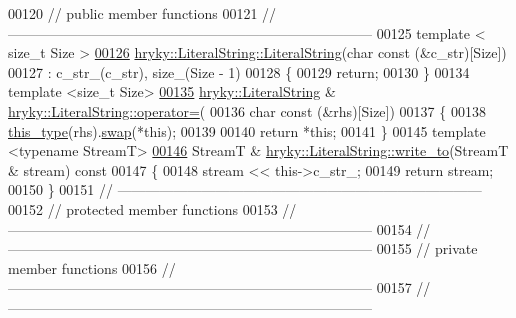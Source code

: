 \begin{DoxyCode}
00120 \textcolor{comment}{// public member functions}
00121 \textcolor{comment}{//
      ------------------------------------------------------------------------------}
00125 \textcolor{comment}{}\textcolor{keyword}{template} < \textcolor{keywordtype}{size\_t} Size >
\hypertarget{literal__string_8h_source_l00126}{}\hyperlink{classhryky_1_1_literal_string_a49f738a4ab21416ad537d0e21a64b8bd}{00126} \hyperlink{classhryky_1_1_literal_string_a2a4124b3bdb4cef9b2d71b318b702038}{hryky::LiteralString::LiteralString}(\textcolor{keywordtype}{char} \textcolor{keyword}{const} (&c\_str)[Size])
00127     : c\_str\_(c\_str), size\_(Size - 1)
00128 \{
00129     \textcolor{keywordflow}{return};
00130 \}
00134 \textcolor{keyword}{template} <\textcolor{keywordtype}{size\_t} Size>
\hypertarget{literal__string_8h_source_l00135}{}\hyperlink{classhryky_1_1_literal_string_a7b2563fbbbf665c982e6b23b966a83a4}{00135} \hyperlink{classhryky_1_1_literal_string}{hryky::LiteralString} & \hyperlink{classhryky_1_1_literal_string_a7b2563fbbbf665c982e6b23b966a83a4}{hryky::LiteralString::operator=}(
00136     \textcolor{keywordtype}{char} \textcolor{keyword}{const} (&rhs)[Size])
00137 \{
00138     \hyperlink{classhryky_1_1_literal_string}{this_type}(rhs).\hyperlink{classhryky_1_1_literal_string_a482315d45c49dc688b017c2793c92730}{swap}(*\textcolor{keyword}{this});
00139 
00140     \textcolor{keywordflow}{return} *\textcolor{keyword}{this};
00141 \}
00145 \textcolor{keyword}{template} <\textcolor{keyword}{typename} StreamT>
\hypertarget{literal__string_8h_source_l00146}{}\hyperlink{classhryky_1_1_literal_string_ab6cbb2ab10459a946ef3d186d1014178}{00146} StreamT & \hyperlink{classhryky_1_1_literal_string_ab6cbb2ab10459a946ef3d186d1014178}{hryky::LiteralString::write_to}(StreamT & stream)\textcolor{keyword}{ const}
00147 \textcolor{keyword}{}\{
00148     stream << this->c\_str\_;
00149     \textcolor{keywordflow}{return} stream;
00150 \}
00151 \textcolor{comment}{//
      ------------------------------------------------------------------------------}
00152 \textcolor{comment}{// protected member functions}
00153 \textcolor{comment}{//
      ------------------------------------------------------------------------------}
00154 \textcolor{comment}{//
      ------------------------------------------------------------------------------}
00155 \textcolor{comment}{// private member functions}
00156 \textcolor{comment}{//
      ------------------------------------------------------------------------------}
00157 \textcolor{comment}{//
      ------------------------------------------------------------------------------}

\end{DoxyCode}
